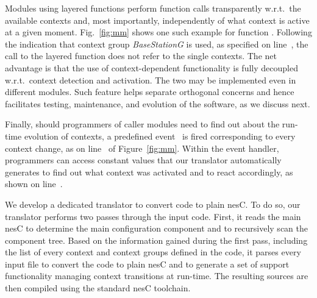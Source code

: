 
Modules using layered functions perform function calls transparently
w.r.t.\ the available contexts and, most importantly, independently of
what context is active at a given moment. Fig.~\ref{fig:mm} shows one
such example for function . Following the indication that
context group \emph{BaseStationG} is used, as specified on
line~, the call to the layered function 
does not refer to the single contexts. The net advantage is that
the use of context-dependent functionality is fully decoupled w.r.t.\
context detection and activation. The two may be implemented even in
different modules. Such feature helps separate
orthogonal concerns and hence facilitates testing, maintenance,
and evolution of the software, as we discuss next.

Finally, should programmers of caller modules need to find out
about the run-time evolution of contexts, a predefined event~ is
fired corresponding to every context change, as on
line~ of Figure~\ref{fig:mm}. %
Within the event handler, programmers can access constant values that
our translator automatically generates to find out what context was
activated and to react accordingly, as shown on
line~.



 We develop a dedicated translator to convert
\conesc code to plain nesC. To do so, our translator performs two
passes through the input code. First, it reads the main nesC
 to determine the main configuration component and to
recursively scan the component tree. Based on the information gained
during the first pass, including the list of every context and context
groups defined in the code, it parses every input file to convert the
\conesc code to plain nesC and to generate a set of support
functionality managing context transitions at run-time. The resulting
sources are then compiled using the standard nesC toolchain.

